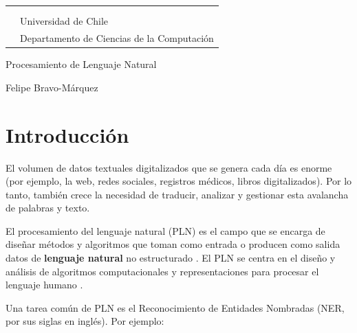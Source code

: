 \documentclass{book}
\begin{document}
\pagestyle{empty}


\begin{tabular}{rl}


& \\
& \\
& Universidad de Chile\\
& Departamento de Ciencias de la Computación
\end{tabular}
\vskip 1.5cm

\begin{center}

{\large Procesamiento de Lenguaje Natural}

\vskip 2.0cm






\vskip 1.5cm
Felipe Bravo-Márquez
\end{center}



\newpage
\thispagestyle{empty}

\newpage
{}

\tableofcontents 
\newpage

\listoftables
\newpage
\listoffigures
\newpage


\thispagestyle{empty}






\chapter{Introducción}

El volumen de datos textuales digitalizados que se genera cada día es enorme (por ejemplo, la web, redes sociales, registros médicos, libros digitalizados). Por lo tanto, también crece la necesidad de traducir, analizar y gestionar esta avalancha de palabras y texto.

El procesamiento del lenguaje natural (PLN) es el campo que se encarga de diseñar métodos y algoritmos que toman como entrada o producen como salida datos de \textbf{lenguaje natural} no estructurado \cite{goldberg2017neural}. El PLN se centra en el diseño y análisis de algoritmos computacionales y representaciones para procesar el lenguaje humano \cite{jacobbook}.





Una tarea común de PLN es el Reconocimiento de Entidades Nombradas (NER, por sus siglas en inglés). Por ejemplo:
\end{document}

